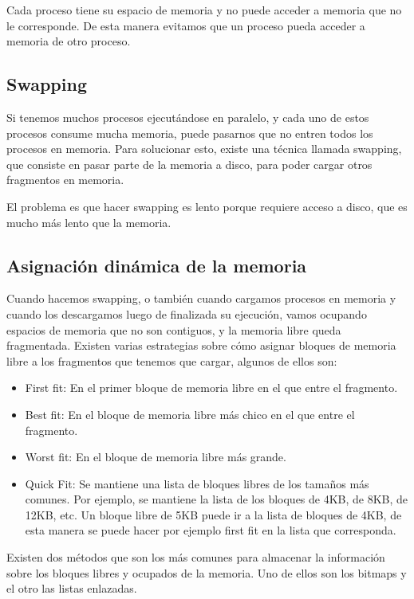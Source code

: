 \documentclass{article}
\begin{document}
Cada proceso tiene su espacio de memoria y no puede acceder a memoria que no le corresponde. De esta manera evitamos que un proceso pueda acceder a memoria de otro proceso.

\subsection{Swapping}

Si tenemos muchos procesos ejecut\'andose en paralelo, y cada uno de estos procesos consume mucha memoria, puede pasarnos que no entren todos los procesos en memoria. Para solucionar esto, existe una t\'ecnica llamada swapping, que consiste en pasar parte de la memoria a disco, para poder cargar otros fragmentos en memoria.

El problema es que hacer swapping es lento porque requiere acceso a disco, que es mucho m\'as lento que la memoria.

\subsection{Asignaci\'on din\'amica de la memoria}

Cuando hacemos swapping, o tambi\'en cuando cargamos procesos en memoria y cuando los descargamos luego de finalizada su ejecuci\'on, vamos ocupando espacios de memoria que no son contiguos, y la memoria libre queda fragmentada. Existen varias estrategias sobre c\'omo asignar bloques de memoria libre a los fragmentos que tenemos que cargar, algunos de ellos son:

\begin{itemize}
\item First fit: En el primer bloque de memoria libre en el que entre el fragmento.
\item Best fit: En el bloque de memoria libre m\'as chico en el que entre el fragmento.
\item Worst fit: En el bloque de memoria libre m\'as grande.
\item Quick Fit: Se mantiene una lista de bloques libres de los tama\~nos m\'as comunes. Por ejemplo, se mantiene la lista de los bloques de 4KB, de 8KB, de 12KB, etc. Un bloque libre de 5KB puede ir a la lista de bloques de 4KB, de esta manera se puede hacer por ejemplo first fit en la lista que corresponda.
\end{itemize}

Existen dos m\'etodos que son los m\'as comunes para almacenar la informaci\'on sobre los bloques libres y ocupados de la memoria. Uno de ellos son los bitmaps y el otro las listas enlazadas.
\end{document}
